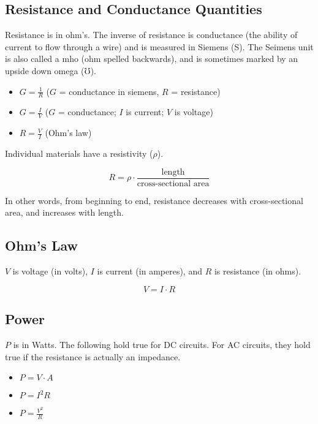 \subsection{Resistance and Conductance Quantities}

Resistance is in ohm's.  The inverse of resistance is conductance (the ability of current to flow through a wire) and is measured in Siemens (S).  The Seimens unit is also called a mho (ohm spelled backwards), and is sometimes marked by an upside down omega (℧).

\begin{itemize}
\item $G = \frac{1}{R}$ ($G$ = conductance in siemens, $R$ = resistance)
\item $G = \frac{I}{V}$ ($G$ = conductance; $I$ is current; $V$ is voltage)
\item $R = \frac{V}{I}$ (Ohm's law)
\end{itemize}

Individual materials have a resistivity ($\rho$).

\begin{equation}
R = \rho \cdot \frac{\textrm{length}}{\textrm{cross-sectional area}}
\end{equation}

In other words, from beginning to end, resistance decreases with cross-sectional area, and increases with length.

\subsection{Ohm's Law}

$V$ is voltage (in volts), $I$ is current (in amperes), and $R$ is resistance (in ohms).

\begin{equation}
V = I\cdot R
\end{equation}

\subsection{Power}

$P$ is in Watts.  The following hold true for DC circuits.  For AC circuits, they hold true if the resistance is actually an impedance.

\begin{itemize}
\item $P = V\cdot A$
\item $P = I^2R$
\item $P = \frac{V^2}{R}$
\end{itemize}

